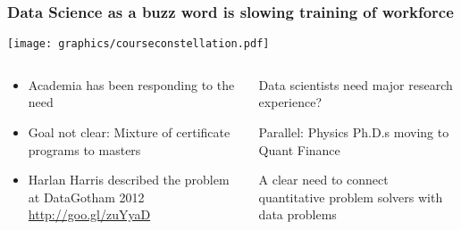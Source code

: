 \begin{frame}
\frametitle{Data Science as a buzz word is slowing training of workforce}

\begin{center}
\texttt{[image: graphics/courseconstellation.pdf]}

\begin{columns}

\begin{column}{0.5\textwidth}
\begin{center}
\begin{itemize}
    \tiny\item \tiny{Academia has been responding to the need}
    \item \tiny{Goal not clear: Mixture of certificate programs to masters} 
    \item \tiny{Harlan Harris described the problem at DataGotham 2012 \url{http://goo.gl/zuYyaD}}
\end{itemize}
\end{center}
\end{column}

\begin{column}{0.5\textwidth}
\begin{itemize}
    \tiny{\item Data scientists need major research experience?}
    \tiny{\item Parallel: Physics Ph.D.s moving to Quant Finance}
    \tiny{\item A clear need to connect quantitative problem solvers with data problems}
\end{itemize}
\end{column}

\end{columns}

\end{center}

\end{frame}

